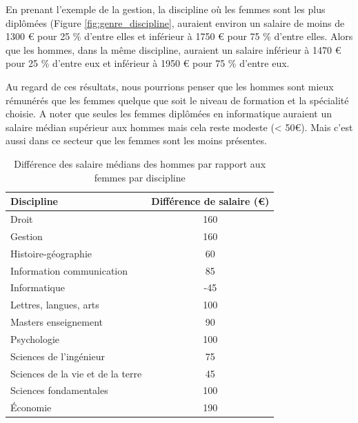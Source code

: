 \documentclass[12pt, a4paper, titlepage, table]{article}
\begin{document}
	En prenant l'exemple de la gestion, la discipline où les femmes sont les plus diplômées (Figure \ref{fig:genre_discipline}, auraient environ un salaire de moins de 1300 € pour 25 \% d'entre elles et inférieur à 1750 € pour 75 \% d'entre elles.
	Alors que les hommes, dans la même discipline, auraient un salaire inférieur à 1470 € pour  25 \% d'entre eux et inférieur à 1950 € pour 75 \% d'entre eux. 
	
	Au regard de ces résultats, nous pourrions penser que les hommes sont mieux rémunérés que les femmes quelque que soit le niveau de formation et la spécialité choisie. A noter que seules les femmes diplômées en informatique auraient un salaire médian supérieur aux hommes mais cela reste modeste (< 50€). Mais c'est aussi dans ce secteur que les femmes sont les moins présentes.
	
	\begin{table}[H]
		\centering
		\begin{tabular}{lc}
			\toprule
			\textbf{Discipline} & \textbf{Différence de salaire (€)} \\
			\midrule
			Droit & 160 \\
			Gestion & 160 \\
			Histoire-géographie & 60 \\
			Information communication & 85 \\
			Informatique & -45 \\
			Lettres, langues, arts & 100 \\
			Masters enseignement & 90 \\
			Psychologie & 100 \\
			Sciences de l'ingénieur & 75 \\
			Sciences de la vie et de la terre & 45 \\
			Sciences fondamentales & 100 \\
			Économie & 190 \\
			\bottomrule
		\end{tabular}
		\caption{Différence des salaire médians des hommes par rapport aux femmes par discipline}
		\label{tab:diff_salaire_genre}
	\end{table}
\end{document}
